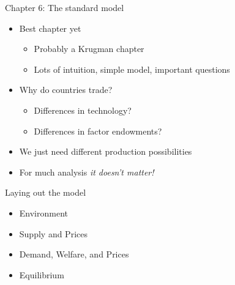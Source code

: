 \documentclass[ignorenonframetext,]{beamer}
\begin{document}
\begin{frame}{Chapter 6: The standard model}

    \begin{itemize}
        \item Best chapter yet 
        \begin{itemize}
            \item Probably a Krugman chapter
            \item Lots of intuition, simple model, important questions
        \end{itemize}
        \item Why do countries trade?
        \begin{itemize}
            \item Differences in technology?
            \item Differences in factor endowments?
        \end{itemize}
        \item We just need different production possibilities
        \item For much analysis \emph{it doesn't matter!}
    \end{itemize}
            
\end{frame}

\begin{frame}{Laying out the model}

    \begin{itemize}
        \item Environment 
        \item Supply and Prices
        \item Demand, Welfare, and Prices
        \item Equilibrium
    \end{itemize}
            
\end{frame}
\end{document}
